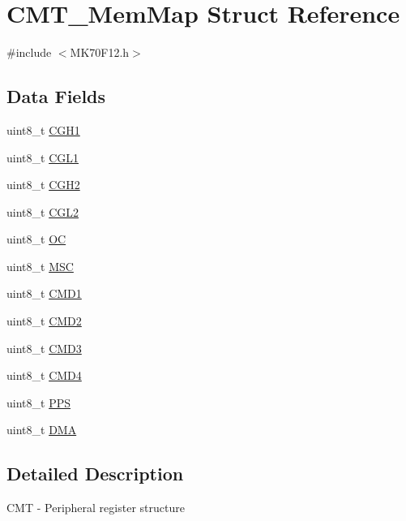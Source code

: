 \hypertarget{struct_c_m_t___mem_map}{}\section{C\+M\+T\+\_\+\+Mem\+Map Struct Reference}
\label{struct_c_m_t___mem_map}


{\ttfamily \#include $<$M\+K70\+F12.\+h$>$}

\subsection*{Data Fields}
\begin{DoxyCompactItemize}
\item 
uint8\+\_\+t \hyperlink{struct_c_m_t___mem_map_a5efaf7b63ca9b1c492c633304e306dfa}{C\+G\+H1}
\item 
uint8\+\_\+t \hyperlink{struct_c_m_t___mem_map_a3251aaf1799b7c991993412230df664b}{C\+G\+L1}
\item 
uint8\+\_\+t \hyperlink{struct_c_m_t___mem_map_ae61900f68e5537b44f02af4f79a902e4}{C\+G\+H2}
\item 
uint8\+\_\+t \hyperlink{struct_c_m_t___mem_map_ae37d0c89ef9e59676774e958d5e96153}{C\+G\+L2}
\item 
uint8\+\_\+t \hyperlink{struct_c_m_t___mem_map_a67d3243d0c24b20b493fd919433dd84c}{O\+C}
\item 
uint8\+\_\+t \hyperlink{struct_c_m_t___mem_map_ad1905c6966e1ac635348ce19d5c44ae9}{M\+S\+C}
\item 
uint8\+\_\+t \hyperlink{struct_c_m_t___mem_map_a6771f22304d3dc09e2c1df31985a1f2a}{C\+M\+D1}
\item 
uint8\+\_\+t \hyperlink{struct_c_m_t___mem_map_a40660a71cbcc2c0a2b0690bf2f8017d3}{C\+M\+D2}
\item 
uint8\+\_\+t \hyperlink{struct_c_m_t___mem_map_a7918a8c8dfb707fc6ac973f26495d20d}{C\+M\+D3}
\item 
uint8\+\_\+t \hyperlink{struct_c_m_t___mem_map_a0e59339adacb7b8a3b1867bb5bf23d0d}{C\+M\+D4}
\item 
uint8\+\_\+t \hyperlink{struct_c_m_t___mem_map_a3a70b1ee9e4f0c56e0b2f48e059e1590}{P\+P\+S}
\item 
uint8\+\_\+t \hyperlink{struct_c_m_t___mem_map_a3fec559e64d6d6210cbecbbb8368adda}{D\+M\+A}
\end{DoxyCompactItemize}


\subsection{Detailed Description}
C\+M\+T -\/ Peripheral register structure 

